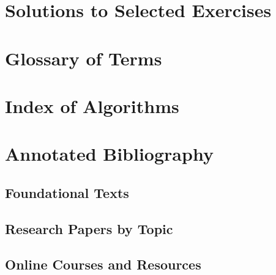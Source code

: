\documentclass[12pt, oneside, openany]{book}
\begin{document}
\chapter{Solutions to Selected Exercises}

\chapter{Glossary of Terms}

\chapter{Index of Algorithms}

\chapter{Annotated Bibliography}
\section{Foundational Texts}
\section{Research Papers by Topic}
\section{Online Courses and Resources}

% 
% 
\end{document}
